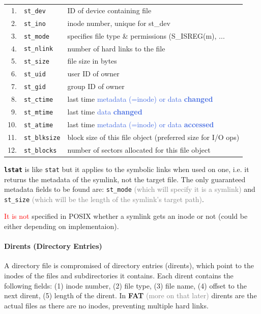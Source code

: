 \documentclass[openany,12pt]{book}
\newcommand{\code}[1]{\texttt{#1}}
\newcommand{\red}[1]{\textcolor{Red}{#1}}
\newcommand{\blue}[1]{\textcolor{RoyalBlue}{#1}}
\newcommand{\gray}[1]{\textcolor{gray}{#1}}
\begin{document}
\begin{tabular}{r l l}
1. & \texttt{st\_dev} & ID of device containing file \\
2. & \texttt{st\_ino} & inode number, unique for st\_dev \\
3. & \texttt{st\_mode} & specifies file type \& permissions (S\_ISREG(m), ... \\
4. & \texttt{st\_nlink} & number of hard links to the file \\
5. & \texttt{st\_size} & file size in bytes \\
6. & \texttt{st\_uid} & user ID of owner \\
7. & \texttt{st\_gid} & group ID of owner \\
8. & \texttt{st\_ctime} & last time \blue{metadata (=inode) or data \textbf{changed}} \\
9. & \texttt{st\_mtime} & last time \blue{data \textbf{changed}} \\
10. & \texttt{st\_atime} & last time \blue{metadata (=inode) or data \textbf{accessed}} \\
11. & \texttt{st\_blksize} & block size of this file object (preferred size for I/O ops) \\
12. & \texttt{st\_blocks} & number of sectors allocated for this file object \\
\end{tabular}

\textbf{\code{lstat}} is like \code{stat} but it applies to the symbolic links when used on one, i.e. it returns the metadata of the symlink, not the target file. The only guaranteed metadata fields to be found are: \code{st\_mode} \gray{(which will specify it is a symlink)} and \code{st\_size} \gray{(which will be the length of the symlink's target path)}.

\red{It is not} specified in POSIX whether a symlink gets an inode or not (could be either
 depending on implementaion).


\paragraph{Dirents (Directory Entries)} A directory file is compromised of directory entries (dirents), which point to the inodes of the files and subdirectories it contains. Each dirent contains the following fields: (1) inode number, (2) file type, (3) file name, (4) offset to the next dirent, (5) length of the dirent. In \textbf{FAT} \gray{(more on that later)} dirents are the actual files as there are no inodes, preventing multiple hard links.
\end{document}
